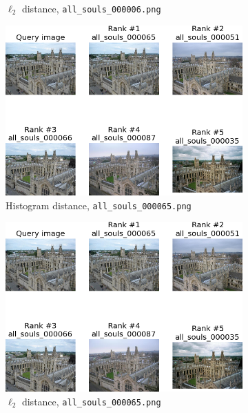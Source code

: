 \documentclass[a4paper,10pt]{article}
\begin{document}
\begin{figure}
\begin{subfigure}{0.47\textwidth}
    \caption{$\ell_2$ distance, \texttt{all\_souls\_000006.png}}
  \end{subfigure}
  \begin{subfigure}{0.47\textwidth}
    \centering
    \includegraphics[width=\textwidth]{ranking_h_65.png}
    \caption{Histogram distance, \texttt{all\_souls\_000065.png}}
  \end{subfigure}
  \hspace*{\fill}
  \begin{subfigure}{0.47\textwidth}
    \centering
    \includegraphics[width=\textwidth]{ranking_l_65.png}
    \caption{$\ell_2$ distance, \texttt{all\_souls\_000065.png}}
  \end{subfigure}
  \begin{subfigure}{0.47\textwidth}
    \centering

\end{subfigure}
\end{figure}
\end{document}
